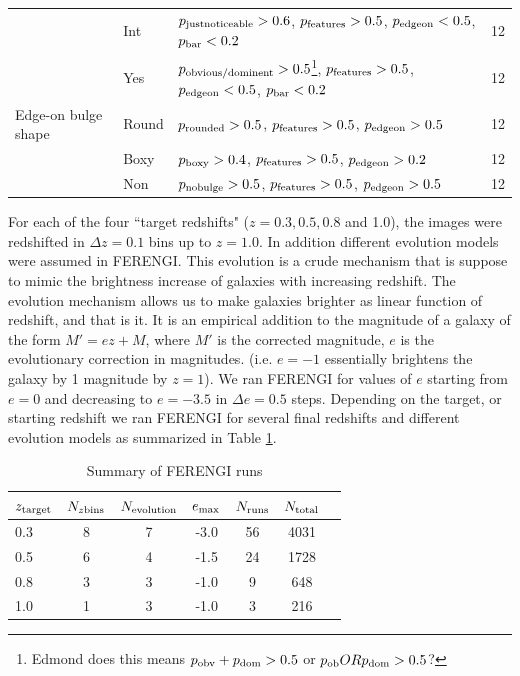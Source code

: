 \documentclass[usenatbib]{mn2e}
\begin{document}
\begin{table}
\begin{tabular}{lllc}
& Int &  $p_{\rm justnoticeable}>0.6$, $p_{\rm features} > 0.5$, $p_{\rm edgeon} < 0.5$, $p_{\rm bar} < 0.2$ & 12 \\
& Yes & $p_{\rm obvious/dominent}>0.5$\footnote{Edmond does this means $p_{\rm obv}+p_{\rm dom}>0.5$ or $p_{\rm ob} OR p_{\rm dom} >0.5$? }, $p_{\rm features} > 0.5$, $p_{\rm edgeon} < 0.5$, $p_{\rm bar} < 0.2$ & 12 \\
Edge-on bulge shape 
& Round & $p_{\rm rounded}>0.5$, $p_{\rm features} > 0.5$, $p_{\rm edgeon} > 0.5$ & 12\\
& Boxy & $p_{\rm boxy}>0.4$, $p_{\rm features} > 0.5$, $p_{\rm edgeon} > 0.2$ & 12\\
& Non & $p_{\rm nobulge}>0.5$, $p_{\rm features} > 0.5$, $p_{\rm edgeon} > 0.5$ & 12\\
\hline\hline
\end{tabular}
\end{table}

For each of the four ``target redshifts" ($z = 0.3, 0.5, 0.8$ and 1.0), the images were redshifted in $\Delta z = 0.1$ bins up to $z=1.0$. In addition different evolution models were assumed in FERENGI. This evolution is a crude mechanism that is suppose to mimic the brightness increase of galaxies with increasing redshift. The evolution mechanism allows us to make galaxies brighter as linear function of redshift, and that is it. It is an empirical addition to the magnitude of a galaxy of the form $M' = e z + M$, where $M'$ is the corrected magnitude, $e$ is the evolutionary correction in magnitudes.  (i.e. $e=-1$ essentially brightens the galaxy by 1 magnitude by $z=1$). We ran FERENGI for values of $e$ starting from $e=0$ and decreasing to $e=-3.5$ in $\Delta e = 0.5$ steps. Depending on the target, or starting redshift we ran FERENGI for several final redshifts and different evolution models as summarized in Table \ref{ferengi}. 

\begin{table}
\caption{Summary of FERENGI runs \label{ferengi}}
\begin{tabular}{lcccccc}
\hline\hline
$z_{\rm target}$ &  $N_{z {\rm bins}}$ & $N_{\rm evolution}$ & $e_{\rm max}$ & $N_{\rm runs}$ & $N_{\rm total}$\\
\hline
0.3 & 8 & 7 & -3.0 & 56 & 4031 \\
0.5 & 6 & 4 & -1.5 & 24 & 1728 \\
0.8 & 3 & 3 & -1.0 & 9 & 648 \\
1.0 & 1 & 3 & -1.0 & 3 & 216 \\
\hline\hline
\end{tabular}
\end{table}
\end{document}
